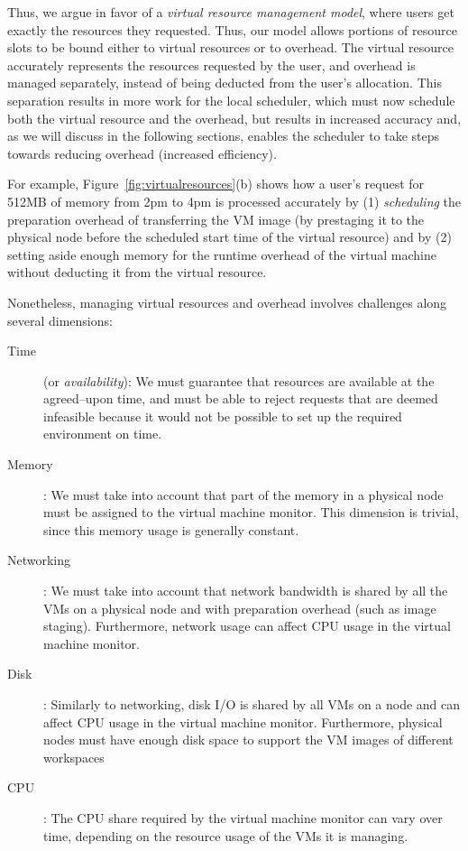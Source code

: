 Thus, we argue in favor of a \emph{virtual resource management model}, where users get exactly the resources they requested. Thus, our model allows portions of resource slots to be bound either to virtual resources or
to overhead. The virtual resource accurately represents the resources requested by the user, and overhead is managed separately, instead of being deducted from the user's allocation. This separation results in more work for the local scheduler, which must now schedule both the virtual resource and the overhead, but results in increased accuracy and, as we will discuss in the following sections, enables the scheduler to take steps towards reducing overhead (increased efficiency).

For example, Figure~\ref{fig:virtualresources}(b) shows how a user's request for 512MB of memory from 2pm to 4pm is processed accurately by (1) \emph{scheduling} the preparation overhead of transferring the VM image (by prestaging it to the physical node before the scheduled start time of the virtual resource) and by (2) setting aside enough memory for the runtime overhead of the virtual machine without deducting it from the virtual resource.

Nonetheless, managing virtual resources and overhead involves challenges along several dimensions:

\begin{description}
\item[Time] (or \emph{availability}): We must guarantee that resources are available at the agreed--upon time, and must be able to reject requests that are deemed infeasible because it would not be possible to set up the required environment on time.
\item[Memory]: We must take into account that part of the memory in a physical node must be assigned to the virtual machine monitor. This dimension is trivial, since this memory usage is generally constant.
\item[Networking]: We must take into account that network bandwidth is shared by all the VMs on a physical node and with preparation overhead (such as image staging). Furthermore, network usage can affect CPU usage in the virtual machine monitor.
\item[Disk]: Similarly to networking, disk I/O is shared by all VMs on a node and can affect CPU usage in the virtual machine monitor. Furthermore, physical nodes must have enough disk space to support the VM images of different workspaces
\item[CPU]: The CPU share required by the virtual machine monitor can vary over time, depending on the resource usage of the VMs it is managing.
\end{description}

